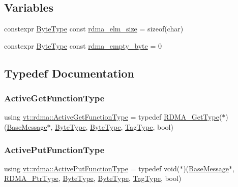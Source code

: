 \subsection*{Variables}
\begin{DoxyCompactItemize}
\item 
constexpr \hyperlink{namespacevt_aab8d55968084610ce3b17057981e9300}{Byte\+Type} const \hyperlink{namespacevt_1_1rdma_ad167cbb60749088647bbeee80ded6100}{rdma\+\_\+elm\+\_\+size} = sizeof(char)
\item 
constexpr \hyperlink{namespacevt_aab8d55968084610ce3b17057981e9300}{Byte\+Type} const \hyperlink{namespacevt_1_1rdma_aa4cbaba7c412337495b61a42d3eb134c}{rdma\+\_\+empty\+\_\+byte} = 0
\end{DoxyCompactItemize}


\subsection{Typedef Documentation}
\mbox{\label{namespacevt_1_1rdma_af564945ba7e35e15bccfb9c2a8d7ebd7}} 
\subsubsection{\texorpdfstring{Active\+Get\+Function\+Type}{ActiveGetFunctionType}}
{\footnotesize\ttfamily using \hyperlink{namespacevt_1_1rdma_af564945ba7e35e15bccfb9c2a8d7ebd7}{vt\+::rdma\+::\+Active\+Get\+Function\+Type} = typedef \hyperlink{namespacevt_a1cab7f4860f65a49ad2c042d6240f288}{R\+D\+M\+A\+\_\+\+Get\+Type}($\ast$)(\hyperlink{namespacevt_ac34f95a5e2b8109b55bfba52b074443d}{Base\+Message}$\ast$, \hyperlink{namespacevt_aab8d55968084610ce3b17057981e9300}{Byte\+Type}, \hyperlink{namespacevt_aab8d55968084610ce3b17057981e9300}{Byte\+Type}, \hyperlink{namespacevt_a84ab281dae04a52a4b243d6bf62d0e52}{Tag\+Type}, bool)}

\mbox{\label{namespacevt_1_1rdma_a9adc598d6d34e2ed3c143711992674d8}} 
\subsubsection{\texorpdfstring{Active\+Put\+Function\+Type}{ActivePutFunctionType}}
{\footnotesize\ttfamily using \hyperlink{namespacevt_1_1rdma_a9adc598d6d34e2ed3c143711992674d8}{vt\+::rdma\+::\+Active\+Put\+Function\+Type} = typedef void($\ast$)(\hyperlink{namespacevt_ac34f95a5e2b8109b55bfba52b074443d}{Base\+Message}$\ast$, \hyperlink{namespacevt_a9e2c953286c7616f7c218e9951790776}{R\+D\+M\+A\+\_\+\+Ptr\+Type}, \hyperlink{namespacevt_aab8d55968084610ce3b17057981e9300}{Byte\+Type}, \hyperlink{namespacevt_aab8d55968084610ce3b17057981e9300}{Byte\+Type}, \hyperlink{namespacevt_a84ab281dae04a52a4b243d6bf62d0e52}{Tag\+Type}, bool)}

